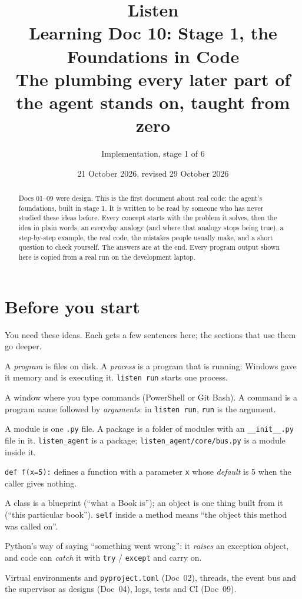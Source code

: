 \documentclass[11pt,a4paper]{article}
\title{\textbf{Listen}\\[4pt]\large Learning Doc 10: Stage 1, the Foundations in Code\\
       \normalsize The plumbing every later part of the agent stands on, taught from zero}
\author{Implementation, stage 1 of 6}
\date{21 October 2026, revised 29 October 2026}
\begin{document}
\sloppy
\maketitle

\begin{abstract}
\noindent Docs 01--09 were design. This is the first document about real code: the agent's
foundations, built in stage 1. It is written to be read by someone who has never studied these
ideas before. Every concept starts with the problem it solves, then the idea in plain words, an
everyday analogy (and where that analogy stops being true), a step-by-step example, the real code,
the mistakes people usually make, and a short question to check yourself. The answers are at the
end. Every program output shown here is copied from a real run on the development laptop.
\end{abstract}

\tableofcontents
\newpage

\section{Before you start}\label{sec:before}
You need these ideas. Each gets a few sentences here; the sections that use them go deeper.

\begin{description}[style=nextline,leftmargin=1.2cm,itemsep=3pt]
  \item[A program and a process] A \emph{program} is files on disk. A \emph{process} is a program
        that is running: Windows gave it memory and is executing it. \texttt{listen run} starts one
        process.
  \item[The terminal] A window where you type commands (PowerShell or Git Bash). A command is a
        program name followed by \emph{arguments}: in \texttt{listen run}, \texttt{run} is the
        argument.
  \item[A Python module and package] A module is one \texttt{.py} file. A package is a folder of
        modules with an \texttt{\_\_init\_\_.py} file in it. \texttt{listen\_agent} is a package;
        \texttt{listen\_agent/core/bus.py} is a module inside it.
  \item[Function, parameter, default] \texttt{def f(x=5):} defines a function with a parameter
        \texttt{x} whose \emph{default} is 5 when the caller gives nothing.
  \item[Class and object] A class is a blueprint (``what a Book is''); an object is one thing built
        from it (``this particular book''). \texttt{self} inside a method means ``the object this
        method was called on''.
  \item[Exception] Python's way of saying ``something went wrong'': it \emph{raises} an exception
        object, and code can \emph{catch} it with \texttt{try} / \texttt{except} and carry on.
  \item[Earlier docs] Virtual environments and \texttt{pyproject.toml} (Doc~02), threads, the
        event bus and the supervisor as designs (Doc~04), logs, tests and CI (Doc~09).
\end{description}
\end{document}
